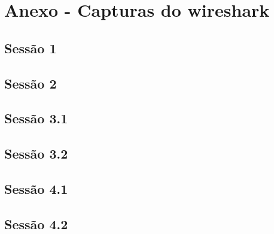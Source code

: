 \documentclass[a4paper,12pt]{article}
\begin{document}
\section{Anexo - Capturas do wireshark}

\subsection{Sessão 1}
{
\scriptsize

}

\subsection{Sessão 2}
{
\scriptsize

}

\subsection{Sessão 3.1}
{
\scriptsize

}

\subsection{Sessão 3.2}
{
\scriptsize

}

\subsection{Sessão 4.1}
{
\scriptsize

}

\subsection{Sessão 4.2}
{
\scriptsize

}
\end{document}
